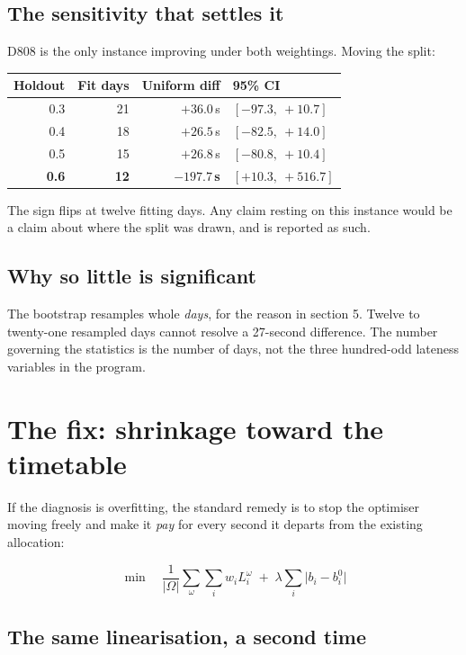 \documentclass[11pt,a4paper]{article}
\begin{document}
\subsection*{The sensitivity that settles it}

D808 is the only instance improving under both weightings. Moving the split:

\begin{center}
\begin{tabular}{@{}rrrl@{}}
\toprule
\textbf{Holdout} & \textbf{Fit days} & \textbf{Uniform diff} & \textbf{95\% CI} \\
\midrule
0.3 & 21 & $+36.0$\,s & $[-97.3,\ +10.7]$ \\
0.4 & 18 & $+26.5$\,s & $[-82.5,\ +14.0]$ \\
0.5 & 15 & $+26.8$\,s & $[-80.8,\ +10.4]$ \\
\textbf{0.6} & \textbf{12} & $\mathbf{-197.7}$\,\textbf{s} & $[+10.3,\ +516.7]$ \\
\bottomrule
\end{tabular}
\end{center}

\noindent The sign flips at twelve fitting days. Any claim resting on this instance would be
a claim about where the split was drawn, and is reported as such.

\subsection*{Why so little is significant}

The bootstrap resamples whole \emph{days}, for the reason in section 5. Twelve to twenty-one
resampled days cannot resolve a 27-second difference. The number governing the statistics is
the number of days, not the three hundred-odd lateness variables in the program.

\section{The fix: shrinkage toward the timetable}

If the diagnosis is overfitting, the standard remedy is to stop the optimiser moving freely
and make it \emph{pay} for every second it departs from the existing allocation:

\[
\min\quad \frac{1}{|\Omega|}\sum_{\omega}\sum_{i} w_i L_i^\omega \;+\; \lambda \sum_{i} \bigl| b_i - b_i^0 \bigr|
\]

\subsection*{The same linearisation, a second time}
\end{document}
